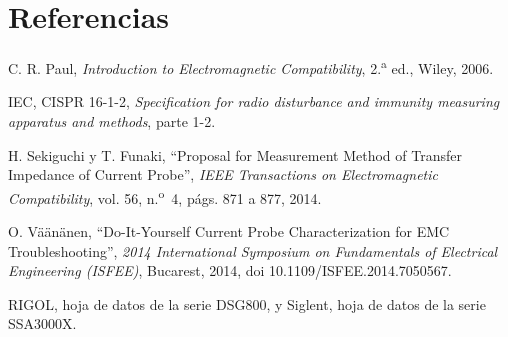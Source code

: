 \documentclass[11pt,a4paper]{article}
\begin{document}
\section{Referencias}

\begin{enumerate}[label={[\arabic*]}, ref={\arabic*}]
  \item \label{ref:paul} C. R. Paul, \textit{Introduction to Electromagnetic Compatibility}, 2.\textsuperscript{a} ed., Wiley, 2006.
  \item \label{ref:cispr} IEC, CISPR 16-1-2, \textit{Specification for radio disturbance and immunity measuring apparatus and methods}, parte 1-2.
  \item \label{ref:sekiguchi} H. Sekiguchi y T. Funaki, ``Proposal for Measurement Method of Transfer Impedance of Current Probe'', \textit{IEEE Transactions on Electromagnetic Compatibility}, vol. 56, n.\textsuperscript{o}~4, págs. 871 a 877, 2014.
  \item \label{ref:paper} O. Väänänen, ``Do-It-Yourself Current Probe Characterization for EMC Troubleshooting'', \textit{2014 International Symposium on Fundamentals of Electrical Engineering (ISFEE)}, Bucarest, 2014, doi 10.1109/ISFEE.2014.7050567.
  \item \label{ref:equipos} RIGOL, hoja de datos de la serie DSG800, y Siglent, hoja de datos de la serie SSA3000X.
\end{enumerate}
\end{document}
